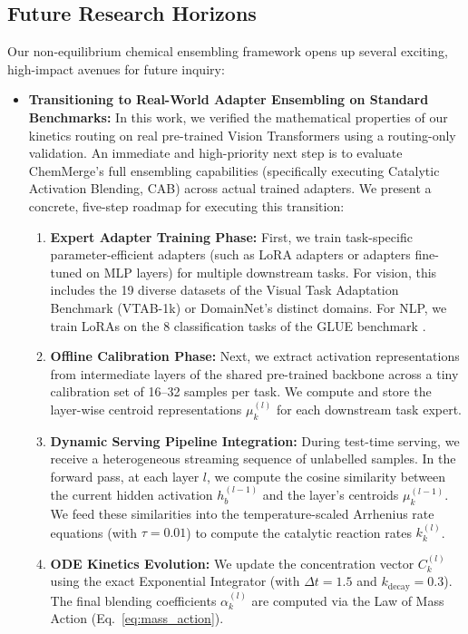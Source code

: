 \subsection{Future Research Horizons}
\label{sec:future_horizons}
Our non-equilibrium chemical ensembling framework opens up several exciting, high-impact avenues for future inquiry:
\begin{itemize}
    \item \textbf{Transitioning to Real-World Adapter Ensembling on Standard Benchmarks:} 
    In this work, we verified the mathematical properties of our kinetics routing on real pre-trained Vision Transformers using a routing-only validation. An immediate and high-priority next step is to evaluate ChemMerge's full ensembling capabilities (specifically executing Catalytic Activation Blending, CAB) across actual trained adapters. We present a concrete, five-step roadmap for executing this transition:
    \begin{enumerate}
        \item \textbf{Expert Adapter Training Phase:} First, we train task-specific parameter-efficient adapters (such as LoRA adapters or adapters fine-tuned on MLP layers) for multiple downstream tasks. For vision, this includes the 19 diverse datasets of the Visual Task Adaptation Benchmark (VTAB-1k) \cite{zhai19vtab} or DomainNet's distinct domains. For NLP, we train LoRAs on the 8 classification tasks of the GLUE benchmark \cite{wang18glue}.
        \item \textbf{Offline Calibration Phase:} Next, we extract activation representations from intermediate layers of the shared pre-trained backbone across a tiny calibration set of 16--32 samples per task. We compute and store the layer-wise centroid representations $\mu_k^{(l)}$ for each downstream task expert.
        \item \textbf{Dynamic Serving Pipeline Integration:} During test-time serving, we receive a heterogeneous streaming sequence of unlabelled samples. In the forward pass, at each layer $l$, we compute the cosine similarity between the current hidden activation $h_b^{(l-1)}$ and the layer's centroids $\mu_k^{(l-1)}$. We feed these similarities into the temperature-scaled Arrhenius rate equations (with $\tau = 0.01$) to compute the catalytic reaction rates $k_k^{(l)}$.
        \item \textbf{ODE Kinetics Evolution:} We update the concentration vector $C_k^{(l)}$ using the exact Exponential Integrator (with $\Delta t = 1.5$ and $k_{\text{decay}} = 0.3$). The final blending coefficients $\alpha_k^{(l)}$ are computed via the Law of Mass Action (Eq.~\ref{eq:mass_action}).

\end{enumerate}
\end{itemize}
